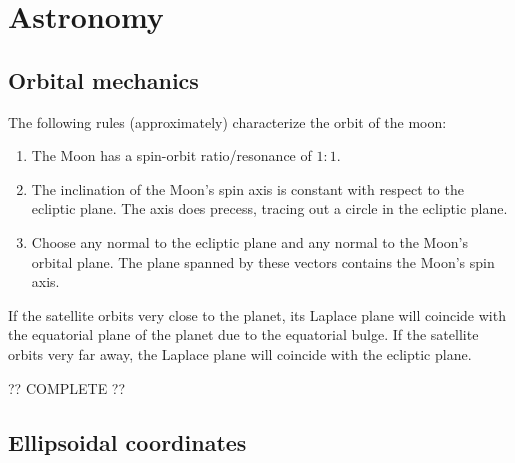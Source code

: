 \section{Astronomy}
\subsection{Orbital mechanics}

    \begin{theorem}
        The following rules (approximately) characterize the orbit of the moon:
        \begin{enumerate}
            \item The Moon has a spin-orbit ratio/resonance of $1:1$.
            \item The inclination of the Moon's spin axis is constant with respect to the ecliptic plane. The axis does precess, tracing out a circle in the ecliptic plane.
            \item Choose any normal to the ecliptic plane and any normal to the Moon's orbital plane. The plane spanned by these vectors contains the Moon's spin axis.
        \end{enumerate}
    \end{theorem}

    \begin{property}
        If the satellite orbits very close to the planet, its Laplace plane will coincide with the equatorial plane of the planet due to the equatorial bulge. If the satellite orbits very far away, the Laplace plane will coincide with the ecliptic plane.
    \end{property}

    ?? COMPLETE ??

\subsection{Ellipsoidal coordinates}


